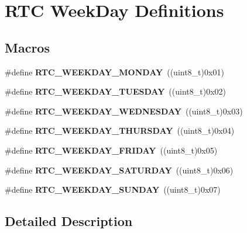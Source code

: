 \hypertarget{group___r_t_c___week_day___definitions}{}\section{R\+TC Week\+Day Definitions}
\label{group___r_t_c___week_day___definitions}
\subsection*{Macros}
\begin{DoxyCompactItemize}
\item 
\#define {\bfseries R\+T\+C\+\_\+\+W\+E\+E\+K\+D\+A\+Y\+\_\+\+M\+O\+N\+D\+AY}~((uint8\+\_\+t)0x01)\hypertarget{group___r_t_c___week_day___definitions_ga9d74c5e20a481db4f4da69f083b768bf}{}\label{group___r_t_c___week_day___definitions_ga9d74c5e20a481db4f4da69f083b768bf}

\item 
\#define {\bfseries R\+T\+C\+\_\+\+W\+E\+E\+K\+D\+A\+Y\+\_\+\+T\+U\+E\+S\+D\+AY}~((uint8\+\_\+t)0x02)\hypertarget{group___r_t_c___week_day___definitions_gaf6b6e124a2e74317448abbfb1943e8cc}{}\label{group___r_t_c___week_day___definitions_gaf6b6e124a2e74317448abbfb1943e8cc}

\item 
\#define {\bfseries R\+T\+C\+\_\+\+W\+E\+E\+K\+D\+A\+Y\+\_\+\+W\+E\+D\+N\+E\+S\+D\+AY}~((uint8\+\_\+t)0x03)\hypertarget{group___r_t_c___week_day___definitions_ga0e8a7c338ffda7c9dd47003762d7054c}{}\label{group___r_t_c___week_day___definitions_ga0e8a7c338ffda7c9dd47003762d7054c}

\item 
\#define {\bfseries R\+T\+C\+\_\+\+W\+E\+E\+K\+D\+A\+Y\+\_\+\+T\+H\+U\+R\+S\+D\+AY}~((uint8\+\_\+t)0x04)\hypertarget{group___r_t_c___week_day___definitions_gab166c84a54ace04f6849a8d0e1764107}{}\label{group___r_t_c___week_day___definitions_gab166c84a54ace04f6849a8d0e1764107}

\item 
\#define {\bfseries R\+T\+C\+\_\+\+W\+E\+E\+K\+D\+A\+Y\+\_\+\+F\+R\+I\+D\+AY}~((uint8\+\_\+t)0x05)\hypertarget{group___r_t_c___week_day___definitions_ga3755707d628f4664c30d02fd2a2f0182}{}\label{group___r_t_c___week_day___definitions_ga3755707d628f4664c30d02fd2a2f0182}

\item 
\#define {\bfseries R\+T\+C\+\_\+\+W\+E\+E\+K\+D\+A\+Y\+\_\+\+S\+A\+T\+U\+R\+D\+AY}~((uint8\+\_\+t)0x06)\hypertarget{group___r_t_c___week_day___definitions_ga3acccb86a8429fea22f2ac46470b5e55}{}\label{group___r_t_c___week_day___definitions_ga3acccb86a8429fea22f2ac46470b5e55}

\item 
\#define {\bfseries R\+T\+C\+\_\+\+W\+E\+E\+K\+D\+A\+Y\+\_\+\+S\+U\+N\+D\+AY}~((uint8\+\_\+t)0x07)\hypertarget{group___r_t_c___week_day___definitions_gadab2da4b8aa50c86d68781b379b75783}{}\label{group___r_t_c___week_day___definitions_gadab2da4b8aa50c86d68781b379b75783}

\end{DoxyCompactItemize}


\subsection{Detailed Description}
